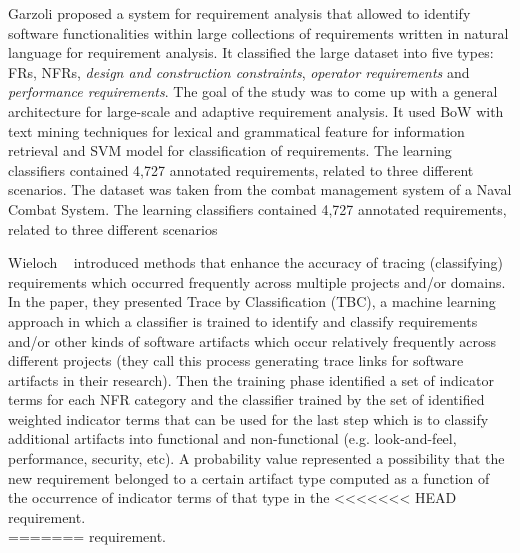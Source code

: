 	Garzoli \cite {Garzoli:2013} proposed a system for requirement analysis that allowed to identify software functionalities within large collections of requirements written in natural language for requirement analysis. It classified the large dataset into five types:
FRs, NFRs, \emph{design and construction constraints}, \emph{operator
requirements} and \emph{performance requirements}.  The goal of the study was to come up with a general
architecture for large-scale and adaptive requirement analysis. It used BoW with text mining techniques for lexical and grammatical feature for information retrieval and SVM model for classification of requirements. The learning classifiers contained 4,727 annotated requirements, related
to three different scenarios. The dataset was taken from
the combat management system of a Naval Combat System. The learning classifiers contained 4,727 annotated requirements, related
to three different scenarios

	Wieloch \etal~\cite{Wieloch:2013} introduced methods that enhance the accuracy
of tracing (classifying) requirements which occurred frequently across multiple
projects and/or domains. In the paper, they presented Trace by Classification
(TBC), a machine learning approach in which a classifier is trained to identify
and classify requirements and/or other kinds of software artifacts which occur
relatively frequently across different projects (they call this process
generating trace links for software artifacts in their research).  Then the training phase identified a set of indicator
terms for each NFR category and the classifier trained by the
set of identified weighted indicator terms that can be used for the last step which is to classify additional
artifacts into functional and non-functional (e.g.
look-and-feel, performance, security, etc). A probability value represented 
a possibility that the new requirement belonged to a certain artifact type
computed as a function of the occurrence of indicator terms of that type in the
<<<<<<< HEAD
requirement. \\
=======
requirement. 

